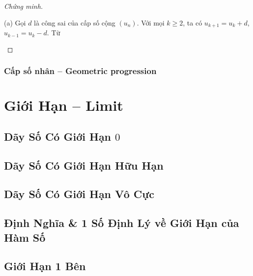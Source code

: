 \documentclass[oneside]{book}
\numberwithin{equation}{section}
\begin{document}
\begin{proof}[Chứng minh]
	\begin{enumerate*}
		\item[(a)] Gọi $d$ là công sai của cấp số cộng $(u_n)$. Với mọi $k\ge 2$, ta có $u_{k+1} = u_k + d$, $u_{k-1} = u_k - d$. Từ 
	\end{enumerate*}
\end{proof}

\subsection{Cấp số nhân -- Geometric progression}


\chapter{Giới Hạn -- Limit}

\section{Dãy Số Có Giới Hạn $0$}


\section{Dãy Số Có Giới Hạn Hữu Hạn}


\section{Dãy Số Có Giới Hạn Vô Cực}


\section{Định Nghĩa \& 1 Số Định Lý về Giới Hạn của Hàm Số}


\section{Giới Hạn 1 Bên}
\end{document}
